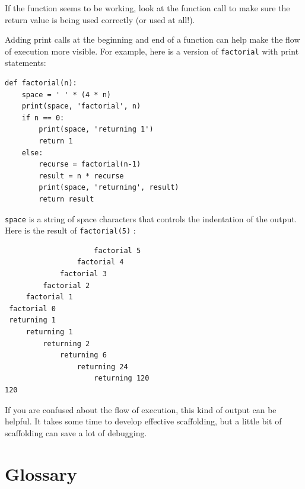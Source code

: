 \documentclass[10pt]{book}
\begin{document}
If the function seems to be working, look at the function call
to make sure the return value is being used correctly (or used
at all!).


Adding print calls at the beginning and end of a function
can help make the flow of execution more visible.
For example, here is a version of {\tt factorial} with
print statements:

\beforeverb
\begin{verbatim}
def factorial(n):
    space = ' ' * (4 * n)
    print(space, 'factorial', n)
    if n == 0:
        print(space, 'returning 1')
        return 1
    else:
        recurse = factorial(n-1)
        result = n * recurse
        print(space, 'returning', result)
        return result
\end{verbatim}
\afterverb
%
{\tt space} is a string of space characters that controls the
indentation of the output.  Here is the result of {\tt factorial(5)} :

\beforeverb
\begin{verbatim}
                     factorial 5
                 factorial 4
             factorial 3
         factorial 2
     factorial 1
 factorial 0
 returning 1
     returning 1
         returning 2
             returning 6
                 returning 24
                     returning 120
120
\end{verbatim}
\afterverb
%
If you are confused about the flow of execution, this kind of
output can be helpful.  It takes some time to develop effective
scaffolding, but a little bit of scaffolding can save a lot of debugging.


\section{Glossary}
\end{document}

